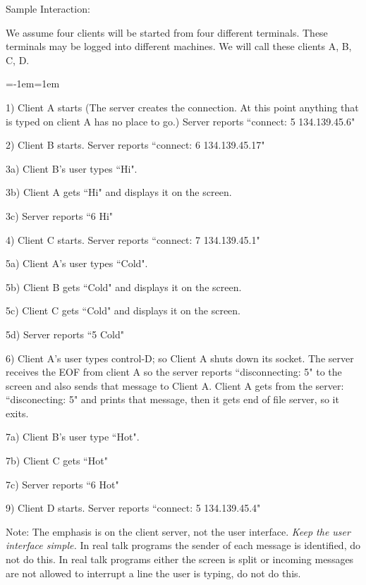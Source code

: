 Sample Interaction:

We assume four clients will be started from four different terminals. 
These terminals may be logged into different machines.
We will call these clients A, B, C, D.

\medskip

{\parskip=0pt\parindent=-1em\leftskip=1em

1) Client A starts (The server creates the connection. At this point anything
that is typed on client A has no place to go.)
Server reports ``connect: 5 134.139.45.6"

2) Client B starts.
Server reports ``connect: 6 134.139.45.17"

3a) Client B's user types ``Hi".

3b) Client A gets ``Hi" and displays it on the screen.

3c) Server reports ``6 Hi"

4) Client C starts.
Server reports ``connect: 7 134.139.45.1"

5a) Client A's user types ``Cold".

5b) Client B gets ``Cold" and displays it on the screen.

5c) Client C gets ``Cold" and displays it on the screen.

5d) Server reports ``5 Cold"

6) Client A's user types control-D; so Client A shuts down its socket.
The server receives the EOF from client A so the server 
reports ``disconnecting: 5" to the screen and also sends 
that message to Client A.
Client A gets from the server: ``disconecting: 5" and prints that message,
then it gets end of file server, so it exits.

7a) Client B's user type ``Hot".

7b) Client C gets ``Hot"

7c) Server reports ``6 Hot"

9) Client D starts.
Server reports ``connect: 5 134.139.45.4"

}
\par

Note: The emphasis is on the client server, not the user interface.
{\it Keep the user interface simple.}
In real talk programs the sender of each message is identified, do not do this.
In real talk programs either the screen is split or incoming messages are
not allowed to interrupt a line the user is typing, do not do this.
\bye
